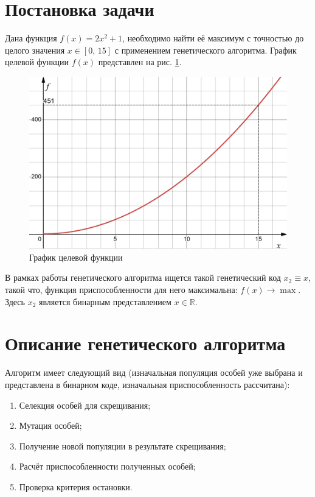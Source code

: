 



	
	
	\setcounter{page}{2}
	\tableofcontents
	\newpage
	
	\newcommand{\diag}[1]{\mathrm{diag}\,#1}
	\renewcommand{\sp}[1]{\mathrm{sp}\,#1}

	\section{Постановка задачи}
	
	Дана функция $f(x) = 2x^2 + 1$, необходимо найти её максимум с точностью до целого значения $x\in [0,\,15
	]$ с применением генетического алгоритма. График целевой функции $f(x)$ представлен на рис. \ref{graph}.
	
	\begin{figure}[h]
		\centering\includegraphics[width=.6\textwidth]{png/graph.png}
		\caption{График целевой функции}
		\label{graph}
	\end{figure}
	
	В рамках работы генетического алгоритма ищется такой генетический код $x_2 \equiv x$, такой что, функция приспособленности для него максимальна: ${f(x)\to\max}$. Здесь $x_2$ является бинарным представлением $x\in \mathbb{R}$.
	
	\section{Описание генетического алгоритма}
	
	Алгоритм имеет следующий вид (изначальная популяция особей уже выбрана и представлена в бинарном коде, изначальная приспособленность рассчитана):
	\begin{enumerate}
		\item Селекция особей для скрещивания;
		\item Мутация особей;
		\item Получение новой популяции в результате скрещивания;
		\item Расчёт приспособленности полученных особей;
		\item Проверка критерия остановки.
	\end{enumerate}


